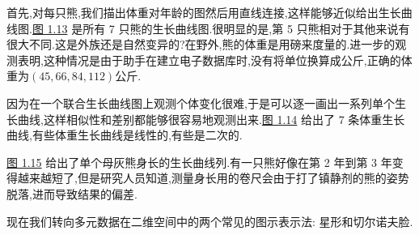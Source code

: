 
首先,对每只熊,我们描出体重对年龄的图然后用直线连接,这样能够近似给出生长曲线图.\hyperref[fig:1.13]{图 1.13} 是所有 7 只熊的生长曲线图.很明显的是,第 5 只熊相对于其他来说有很大不同.这是外族还是自然变异的?在野外,熊的体重是用磅来度量的.进一步的观测表明,这种情况是由于助手在建立电子数据库时,没有将单位换算成公斤,正确的体重为$(45,66,84,112)$公斤.

\begin{mvfigure}
\label{fig:1.13}
\end{mvfigure}

因为在一个联合生长曲线图上观测个体变化很难,于是可以逐一画出一系列单个生长曲线,这样相似性和差别都能够很容易地观测出来.\hyperref[fig:1.14]{图 1.14} 给出了 7 条体重生长曲线,有些体重生长曲线是线性的,有些是二次的.

\begin{mvfigure}
\label{fig:1.14}
\end{mvfigure}

\hyperref[fig:1.15]{图 1.15} 给出了单个母灰熊身长的生长曲线列.有一只熊好像在第 2 年到第 3 年变得越来越短了,但是研究人员知道,测量身长用的卷尺会由于打了镇静剂的熊的姿势脱落,进而导致结果的偏差.

现在我们转向多元数据在二维空间中的两个常见的图示表示法: 星形和切尔诺夫脸.
